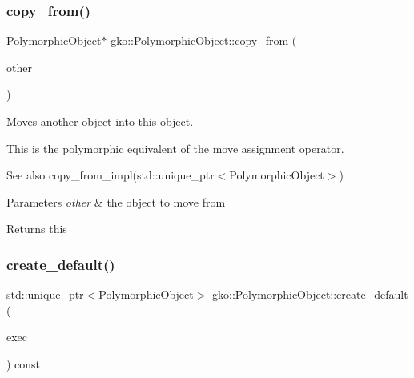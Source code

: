 \subsubsection{\texorpdfstring{copy\+\_\+from()}{copy\_from()}\hspace{0.1cm}{\footnotesize\ttfamily [2/2]}}
{\footnotesize\ttfamily \hyperlink{classgko_1_1PolymorphicObject}{Polymorphic\+Object}$\ast$ gko\+::\+Polymorphic\+Object\+::copy\+\_\+from (\begin{DoxyParamCaption}\item[{std\+::unique\+\_\+ptr$<$ \hyperlink{classgko_1_1PolymorphicObject}{Polymorphic\+Object} $>$}]{other }\end{DoxyParamCaption})\hspace{0.3cm}{\ttfamily [inline]}}



Moves another object into this object. 

This is the polymorphic equivalent of the move assignment operator.

\begin{DoxySeeAlso}{See also}
copy\+\_\+from\+\_\+impl(std\+::unique\+\_\+ptr$<$\+Polymorphic\+Object$>$)
\end{DoxySeeAlso}

\begin{DoxyParams}{Parameters}
{\em other} & the object to move from\\
\hline
\end{DoxyParams}
\begin{DoxyReturn}{Returns}
this 
\end{DoxyReturn}
\mbox{\label{classgko_1_1PolymorphicObject_aca2ad91eee15e667cc0e7d1444a6de47}} 
\subsubsection{\texorpdfstring{create\+\_\+default()}{create\_default()}\hspace{0.1cm}{\footnotesize\ttfamily [1/2]}}
{\footnotesize\ttfamily std\+::unique\+\_\+ptr$<$\hyperlink{classgko_1_1PolymorphicObject}{Polymorphic\+Object}$>$ gko\+::\+Polymorphic\+Object\+::create\+\_\+default (\begin{DoxyParamCaption}\item[{std\+::shared\+\_\+ptr$<$ const \hyperlink{classgko_1_1Executor}{Executor} $>$}]{exec }\end{DoxyParamCaption}) const\hspace{0.3cm}{\ttfamily [inline]}}



